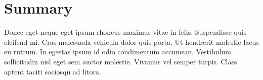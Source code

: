 \section{Summary}

{

\setlength{\parindent}{\parindentDefault}

\par Donec eget neque eget ipsum rhoncus maximus vitae in felis. Suspendisse quis eleifend mi. Cras malesuada vehicula dolor quis porta. Ut hendrerit molestie lacus eu rutrum. In egestas ipsum id odio condimentum accumsan. Vestibulum sollicitudin nisl eget sem auctor molestie. Vivamus vel semper turpis. Class aptent taciti sociosqu ad litora.

}
